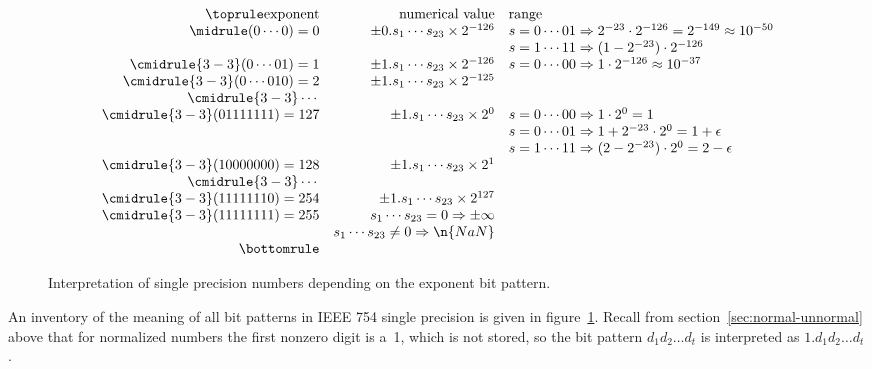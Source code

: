 \begin{figure}[ht]
  \begin{equation}
  \begin{array}{rrl}
    \toprule
    \hbox{exponent}&\hbox{numerical value}&\hbox{range}\\
    \midrule
    (0\cdots0)=0& \pm 0.s_1\cdots s_{23}\times 2^{-126}
            &s=0\cdots 01\Rightarrow 2^{-23}\cdot 2^{-126}=2^{-149}\approx 10^{-50}\\
    &       &s=1\cdots 11\Rightarrow (1-2^{-23})\cdot 2^{-126}\\
    \cmidrule{3-3}
    (0\cdots 01)=1& \pm 1.s_1\cdots s_{23}\times 2^{-126}
            &s=0\cdots 00\Rightarrow 1\cdot 2^{-126}\approx 10^{-37}\\
    \cmidrule{3-3}
    (0\cdots 010)=2& \pm 1.s_1\cdots s_{23}\times 2^{-125}&\\
    \cmidrule{3-3}
    \cdots&&\\
    \cmidrule{3-3}
    (01111111)=127 & \pm 1.s_1\cdots s_{23}\times 2^{0}
            &s=0\cdots 00\Rightarrow 1\cdot 2^{0}=1\\
    &       &s=0\cdots 01\Rightarrow 1+2^{-23}\cdot 2^{0}=1+\epsilon\\
    &       &s=1\cdots 11\Rightarrow (2-2^{-23})\cdot 2^{0}=2-\epsilon\\
    \cmidrule{3-3}
    (10000000)=128 & \pm 1.s_1\cdots s_{23}\times 2^{1}&\\
    \cmidrule{3-3}
    \cdots&&\\
    \cmidrule{3-3}
    (11111110)=254 & \pm 1.s_1\cdots s_{23}\times 2^{127}&\\
    \cmidrule{3-3}
    (11111111)=255 & s_1\cdots s_{23}=0 \Rightarrow \pm\infty &\\
                   & s_1\cdots s_{23}\not=0 \Rightarrow \n{NaN} &\\
    \bottomrule
  \end{array}
  \end{equation}
  \caption{Interpretation of single precision numbers depending on the exponent bit pattern.}
  \label{fig:single-precision}
\end{figure}

An inventory of the meaning of all bit patterns in IEEE
754 single precision is given in figure~\ref{fig:single-precision}.
Recall from section~\ref{sec:normal-unnormal} above
that for normalized numbers the first nonzero digit is a~1, which
is not stored, so the bit pattern $d_1d_2\ldots d_t$ is interpreted as
$1.d_1d_2\ldots d_t$.

